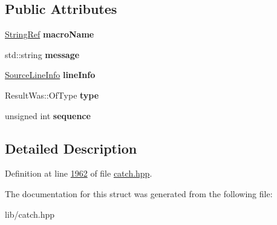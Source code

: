 \subsection*{Public Attributes}
\begin{DoxyCompactItemize}
\item 
\mbox{\label{structCatch_1_1MessageInfo_a3ee7cd41def0989d2193bad7101436a0}} 
\mbox{\hyperlink{classCatch_1_1StringRef}{String\+Ref}} {\bfseries macro\+Name}
\item 
\mbox{\label{structCatch_1_1MessageInfo_ab6cd06e050bf426c6577502a5c50e256}} 
std\+::string {\bfseries message}
\item 
\mbox{\label{structCatch_1_1MessageInfo_a985165328723e599696ebd8e43195cc5}} 
\mbox{\hyperlink{structCatch_1_1SourceLineInfo}{Source\+Line\+Info}} {\bfseries line\+Info}
\item 
\mbox{\label{structCatch_1_1MessageInfo_ae928b9117465c696e45951d9d0284e78}} 
Result\+Was\+::\+Of\+Type {\bfseries type}
\item 
\mbox{\label{structCatch_1_1MessageInfo_a7f4f57ea21e50160adefce7b68a781d6}} 
unsigned int {\bfseries sequence}
\end{DoxyCompactItemize}


\subsection{Detailed Description}


Definition at line \mbox{\hyperlink{catch_8hpp_source_l01962}{1962}} of file \mbox{\hyperlink{catch_8hpp_source}{catch.\+hpp}}.



The documentation for this struct was generated from the following file\+:\begin{DoxyCompactItemize}
\item 
lib/catch.\+hpp\end{DoxyCompactItemize}
